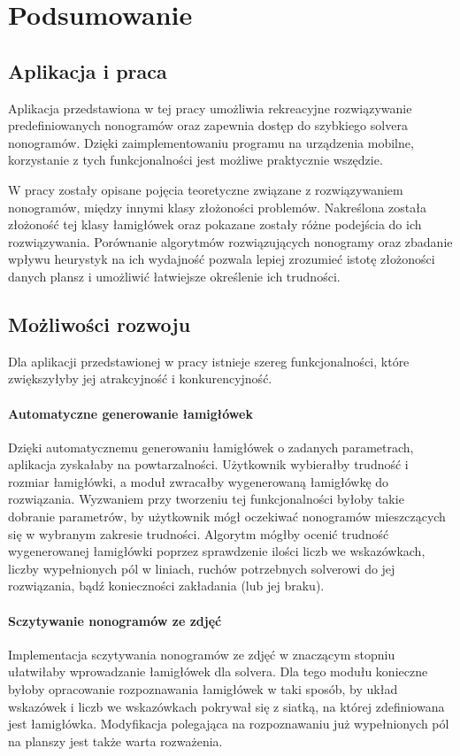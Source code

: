 \chapter{Podsumowanie}
\thispagestyle{chapterBeginStyle}



\section{Aplikacja i praca}
    Aplikacja przedstawiona w tej pracy umożliwia rekreacyjne rozwiązywanie predefiniowanych
nonogramów oraz zapewnia dostęp do szybkiego solvera nonogramów. Dzięki zaimplementowaniu programu
na urządzenia mobilne, korzystanie z tych funkcjonalności jest możliwe praktycznie wszędzie.

    W pracy zostały opisane pojęcia teoretyczne związane z rozwiązywaniem nonogramów, 
między innymi klasy złożoności problemów. Nakreślona została złożoność tej klasy łamigłówek 
oraz pokazane zostały różne podejścia do ich rozwiązywania. Porównanie algorytmów rozwiązujących
nonogramy oraz zbadanie wpływu heurystyk na ich wydajność pozwala lepiej zrozumieć istotę
złożoności danych plansz i umożliwić łatwiejsze określenie ich trudności.



\section{Możliwości rozwoju}
    Dla aplikacji przedstawionej w pracy istnieje szereg funkcjonalności, które zwiększyłyby jej
atrakcyjność i konkurencyjność.

\subsubsection{Automatyczne generowanie łamigłówek}
    Dzięki automatycznemu generowaniu łamigłówek o zadanych parametrach, aplikacja zyskałaby
na powtarzalności. Użytkownik wybierałby trudność i rozmiar łamigłówki, a moduł zwracałby
wygenerowaną łamigłówkę do rozwiązania. Wyzwaniem przy tworzeniu tej funkcjonalności byłoby takie
dobranie parametrów, by użytkownik mógł oczekiwać nonogramów mieszczących się w wybranym zakresie
trudności. Algorytm mógłby ocenić trudność wygenerowanej łamigłówki poprzez sprawdzenie ilości liczb
we wskazówkach, liczby wypełnionych pól w liniach, ruchów potrzebnych solverowi do jej rozwiązania,
bądź konieczności zakładania (lub jej braku).

\subsubsection{Sczytywanie nonogramów ze zdjęć}
    Implementacja sczytywania nonogramów ze zdjęć w znaczącym stopniu ułatwiłaby wprowadzanie
łamigłówek dla solvera. Dla tego modułu konieczne byłoby opracowanie rozpoznawania łamigłówek w taki
sposób, by układ wskazówek i liczb we wskazówkach pokrywał się z siatką, na której zdefiniowana jest
łamigłówka. Modyfikacja polegająca na rozpoznawaniu już wypełnionych pól na planszy jest
także warta rozważenia.

